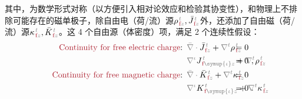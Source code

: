 其中，为数学形式对称（以方便引入相对论效应和检验其协变性\cite{lakhtakiaCovariancesInvariancesMaxwell1995,chen-zhuChenZhuxieUndergraduate_courses2024}），和物理上不排除可能存在的磁单极子，除自由电（荷/流）源${\rho}^{\;\!\mathcolor{gray}{t}}_{\;\!\textcolor{Maroon}{\text{f}}\mathcolor{gray}{z}}, \bar{J}^{\;\!\mathcolor{gray}{t}}_{\;\!\textcolor{Maroon}{\text{f}}\mathcolor{gray}{z}}$外，还添加了自由磁（荷/流）源${\kappa}^{\;\!\mathcolor{gray}{t}}_{\;\!\textcolor{Maroon}{\text{f}}\mathcolor{gray}{z}}, \bar{K}^{\;\!\mathcolor{gray}{t}}_{\;\!\textcolor{Maroon}{\text{f}}\mathcolor{gray}{z}}$\cite{lakhtakiaCovariancesInvariancesMaxwell1995}。这 4 个自由源（体密度）项，满足 2 个连续性假设\cite{mackayElectromagneticAnisotropyBianisotropy2019,lakhtakiaCovariancesInvariancesMaxwell1995,chen-zhuChenZhuxieUndergraduate_courses2024}：
\begin{subequations} \label{eq:Div-em-f}
\begin{align}
	\textcolor{Maroon}{\text{Continuity for free electric charge}}\text{:}&\hspace{0.5em} \mathcolor{gray}{\bar{\nabla} \cdot} \bar{J}^{\;\!\mathcolor{gray}{t}}_{\;\!\textcolor{Maroon}{\text{f}}\mathcolor{gray}{z}} + \mathcolor{gray}{\nabla^t} {\rho}^{\;\!\mathcolor{gray}{t}}_{\;\!\textcolor{Maroon}{\text{f}}\mathcolor{gray}{z}} \hspace{-5.3em} &&= 0 \label{eq:Div-e-f} \\ 
	&\hspace{0.5em} \mathcolor{gray}{\nabla^\iota} J^{\;\!\mathcolor{gray}{t}}_{\;\!\textcolor{Maroon}{\text{f}} \mathcolor{gray}{\symup{\iota}}\mathcolor{gray}{z}} + \mathcolor{gray}{\nabla^t} {\rho}^{\;\!\mathcolor{gray}{t}}_{\;\!\textcolor{Maroon}{\text{f}}\mathcolor{gray}{z}} \hspace{-5.3em} &&= 0~, \label{eq:div-e-f} \\ 
	\textcolor{Maroon}{\text{Continuity for free magnetic charge}}\text{:}&\hspace{0.5em} \mathcolor{gray}{\bar{\nabla} \cdot} \bar{K}^{\;\!\mathcolor{gray}{t}}_{\;\!\textcolor{Maroon}{\text{f}}\mathcolor{gray}{z}} + \mathcolor{gray}{\nabla^t} {\kappa}^{\;\!\mathcolor{gray}{t}}_{\;\!\textcolor{Maroon}{\text{f}}\mathcolor{gray}{z}} \hspace{-5.3em} &&= 0 \label{eq:Div-m-f} \\
	&\hspace{0.5em} \mathcolor{gray}{\nabla^\iota} K^{\;\!\mathcolor{gray}{t}}_{\;\!\textcolor{Maroon}{\text{f}} \mathcolor{gray}{\symup{\iota}}\mathcolor{gray}{z}} + \mathcolor{gray}{\nabla^t} {\kappa}^{\;\!\mathcolor{gray}{t}}_{\;\!\textcolor{Maroon}{\text{f}}\mathcolor{gray}{z}} \hspace{-5.3em} &&= 0~. \label{eq:div-m-f}
\end{align}
\end{subequations}
